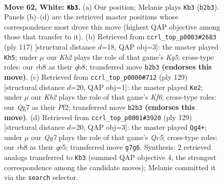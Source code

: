 \documentclass[11pt]{article}
\begin{document}
\clearpage

\begin{figure}[p]\centering
\begin{subfigure}{0.46\textwidth}\centering
\resizebox{\linewidth}{!}{%
\newchessgame
\chessboard[
  setfen={1r6/6Q1/1k6/6P1/4P2P/8/1K6/8 w - - 9 62},
  showmover=false,
  pgfstyle=straightmove, color=movearrow, markmove={b2-b3}
]}
\caption{}
\end{subfigure}\hfill
\begin{subfigure}{0.46\textwidth}\centering
\resizebox{\linewidth}{!}{%
\newchessgame
\chessboard[
  setfen={1Q6/8/4q2p/8/1K4k1/8/1P6/8 b - - 16 59},
  showmover=false,
  pgfstyle=straightmove, color=movearrow, markmove={g4-h5}
]}
\caption{}
\end{subfigure}
\\[4pt]
\begin{subfigure}{0.46\textwidth}\centering
\resizebox{\linewidth}{!}{%
\newchessgame
\chessboard[
  setfen={8/7p/5p2/3K4/7P/5k2/5p2/3R4 b - - 2 65},
  showmover=false,
  pgfstyle=straightmove, color=movearrow, markmove={f3-e2}
]}
\caption{}
\end{subfigure}\hfill
\begin{subfigure}{0.46\textwidth}\centering
\resizebox{\linewidth}{!}{%
\newchessgame
\chessboard[
  setfen={8/1k1P2K1/8/4Q3/p1q5/8/8/8 b - - 0 65},
  showmover=false,
  pgfstyle=straightmove, color=movearrow, markmove={c4-g4}
]}
\caption{}
\end{subfigure}
\caption{\textbf{Move 62, White: \texttt{Kb3}.} (a) Our position; Melanie plays \texttt{Kb3} (\texttt{b2b3}). Panels (b)--(d) are the retrieved master positions whose correspondence most drove this move (highest QAP objective among those that transfer to it). (b) Retrieved from \texttt{ccrl\_top\_p0003\#2683} (ply 117) [structural distance $d$=18, QAP obj=3]: the master played \texttt{Kh5}; under $\mu$ our \emph{Kb2} plays the role of that game's \emph{Kg5}; cross-type roles: our \emph{r}b8 as their \emph{q}b8; transferred move \texttt{b2b3} \textbf{(endorses this move)}. (c) Retrieved from \texttt{ccrl\_top\_p0000\#712} (ply 129) [structural distance $d$=20, QAP obj=1]: the master played \texttt{Ke2}; under $\mu$ our \emph{Kb2} plays the role of that game's \emph{Kf6}; cross-type roles: our \emph{Q}g7 as their \emph{P}f2; transferred move \texttt{b2b3} \textbf{(endorses this move)}. (d) Retrieved from \texttt{ccrl\_top\_p0001\#3920} (ply 129) [structural distance $d$=20, QAP obj=3]: the master played \texttt{Qg4+}; under $\mu$ our \emph{Qg7} plays the role of that game's \emph{Qc5}; cross-type roles: our \emph{r}b8 as their \emph{q}e5; transferred move \texttt{g7g6}. Synthesis: 2 retrieved analogs transferred to \texttt{Kb3} (summed QAP objective 4, the strongest correspondence among the candidate moves); Melanie committed it via the \texttt{search} selector.}
\label{fig:thought-m122}
\end{figure}
\end{document}
